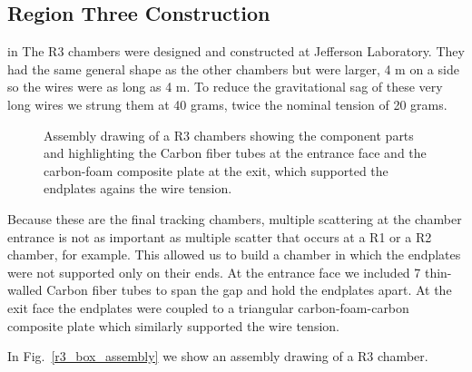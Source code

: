 
\subsection{Region Three Construction}

 in
The R3 chambers were designed and constructed at Jefferson Laboratory.  
They had the same general shape as the other chambers but were larger,
4 m on a side so the wires were as long as 4 m.
To reduce the gravitational sag of these very long wires we
strung them at 40 grams, twice the nominal tension of 20 grams.

\begin{figure}[htpb]
\vspace{7.9cm}
\caption{\small{Assembly drawing of a R3 chambers showing the component
parts and highlighting the Carbon fiber tubes at the entrance face and
the carbon-foam composite plate at the exit, which supported the endplates
agains the wire tension.}}
\label{r3_cut}
\end{figure}

Because these are the final tracking chambers, multiple scattering
at the chamber entrance is not as important as multiple scatter that
occurs at a R1 or a R2 chamber, for example.  This allowed us to 
build a chamber in which the endplates were not supported only on
their ends.  At the entrance face we included 7 thin-walled Carbon
fiber tubes to span the gap and hold the endplates apart.  At the
exit face the endplates were coupled to a triangular carbon-foam-carbon
composite plate which similarly supported the wire tension.

In Fig.~\ref{r3_box_assembly} we show an assembly drawing of a R3 chamber.


